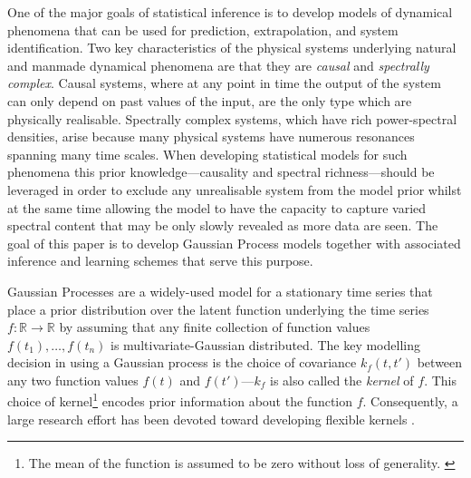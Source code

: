 \documentclass{article}
\newcommand{\R}{\mathbb{R}}   %
\begin{document}
One of the major goals of statistical inference is to develop models of dynamical phenomena that can be used for prediction, extrapolation, and system identification. Two key characteristics of the physical systems underlying natural and manmade dynamical phenomena are that they are \textit{causal} and \textit{spectrally complex}. Causal systems, where at any point in time the output of the system can only depend on past values of the input, are the only type which are physically realisable. Spectrally complex systems, which have rich power-spectral densities, arise because many physical systems have numerous resonances spanning many time scales. When developing statistical models for such phenomena this prior knowledge---causality and spectral richness---should be leveraged in order to exclude any unrealisable system from the model prior whilst at the same time allowing the model to have the capacity to capture varied spectral content that may be only slowly revealed as more data are seen. The goal of this paper is to develop Gaussian Process models together with associated inference and learning schemes that serve this purpose.

Gaussian Processes are a widely-used model for a stationary time series that place a prior distribution over the latent function underlying the time series $f:\R \to \R$ by assuming that any finite collection of function values $f(t_1),\ldots,f(t_n)$ is multivariate-Gaussian distributed. The key modelling decision in using a Gaussian process is the choice of covariance  $k_f(t,t')$ between any two function values $f(t)$ and $f(t')$---$k_f$ is also called the \textit{kernel} of $f$. This choice of kernel\footnote{The mean of the function is assumed to be zero without loss of generality. \cite{Rasmussen:2006:Gaussian_Processes}} encodes prior information about the function $f$. Consequently, a large research effort has been devoted toward developing flexible kernels \cite{Duvenaud:2014:Automatic_Construction,Wilson:2013:Spectral_Mixture,Tobar:2015:Learning_Stationary,Tobar:2015:Inter-Domain_Inducing}. 
\end{document}
